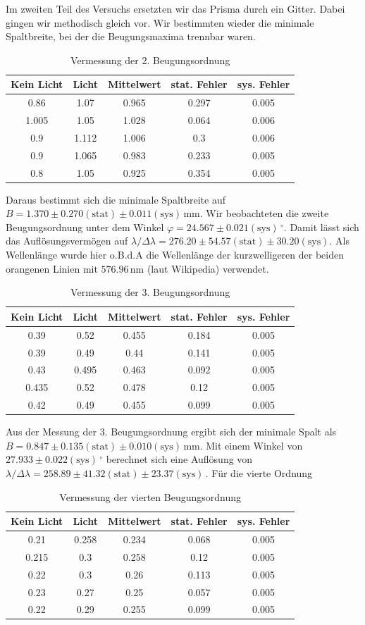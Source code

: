 \documentclass[a4paper, 12pt]{scrartcl}
\begin{document}
Im zweiten Teil des Versuchs ersetzten wir das Prisma durch ein Gitter. Dabei gingen wir methodisch gleich vor. Wir bestimmten wieder die minimale Spaltbreite, bei der die Beugungsmaxima trennbar waren.
\begin{table}[H]\begin{tabular}{c | c | c | c | c}
Kein Licht&Licht&Mittelwert&stat. Fehler&sys. Fehler\\\hline
0.86&1.07&0.965&0.297&0.005\\\hline
1.005&1.05&1.028&0.064&0.006\\\hline
0.9&1.112&1.006&0.3&0.006\\\hline
0.9&1.065&0.983&0.233&0.005\\\hline
0.8&1.05&0.925&0.354&0.005
\end{tabular}\caption{Vermessung der 2. Beugungsordnung}\end{table}
Daraus bestimmt sich die minimale Spaltbreite auf $B=1.370\pm0.270(\text{stat})\pm0.011(\text{sys})\,\text{mm}$. Wir beobachteten die zweite Beugungsordnung unter dem Winkel $\varphi=24.567\pm0.021(\text{sys})\,^\circ$. Damit lässt sich das Auflösungsvermögen auf $\lambda/\Delta\lambda=276.20\pm54.57(\text{stat})\pm30.20(\text{sys})$. Als Wellenlänge wurde hier o.B.d.A die Wellenlänge der kurzwelligeren der beiden orangenen Linien mit $576.96\,\text{nm}$ (laut Wikipedia) verwendet.
\begin{table}[H]\begin{tabular}{c | c | c | c | c}
Kein Licht&Licht&Mittelwert&stat. Fehler&sys. Fehler\\\hline
0.39&0.52&0.455&0.184&0.005\\\hline
0.39&0.49&0.44&0.141&0.005\\\hline
0.43&0.495&0.463&0.092&0.005\\\hline
0.435&0.52&0.478&0.12&0.005\\\hline
0.42&0.49&0.455&0.099&0.005
\end{tabular}\caption{Vermessung der 3. Beugungsordnung}\end{table}
Aus der Messung der 3. Beugungsordnung ergibt sich der minimale Spalt als $B=0.847\pm0.135(\text{stat})\pm0.010(\text{sys})\,\text{mm}$. Mit einem Winkel von $27.933\pm0.022(\text{sys})\,^\circ$ berechnet sich eine Auflösung von $\lambda/\Delta\lambda=258.89\pm41.32(\text{stat})\pm23.37(\text{sys})\,$.
Für die vierte Ordnung
\begin{table}[H]\begin{tabular}{c | c | c | c | c}
Kein Licht&Licht&Mittelwert&stat. Fehler&sys. Fehler\\\hline
0.21&0.258&0.234&0.068&0.005\\\hline
0.215&0.3&0.258&0.12&0.005\\\hline
0.22&0.3&0.26&0.113	&0.005\\\hline
0.23&0.27&0.25&0.057&0.005\\\hline
0.22&0.29&0.255&0.099&0.005
\end{tabular}\caption{Vermessung der vierten Beugungsordnung}\end{table}
\end{document}
